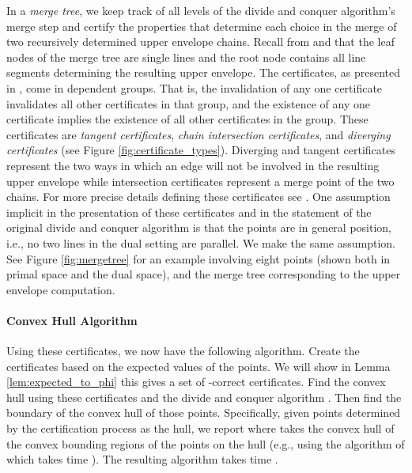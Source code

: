 \documentclass[11pt]{article}
\begin{document}
In a \emph{merge tree}, we keep track of all levels of the divide and conquer algorithm's merge step and certify the properties that determine each choice in the merge of two recursively determined upper envelope chains. 
Recall from \cite{Basch99MobileData} and \cite{Atallah85Dynamic} that the leaf nodes of the merge tree are single lines and the root node contains all line segments determining the resulting upper envelope.  
 The certificates, as presented in \cite{Basch99MobileData}, come in dependent groups. That is, the invalidation of any one certificate invalidates all other certificates in that group, and the existence of any one certificate implies the existence of all other certificates in the group.  
These certificates are \emph{tangent certificates},  
\emph{chain intersection certificates}, 
and \emph{diverging certificates} 
(see Figure \ref{fig:certificate_types}).  Diverging and tangent
certificates represent the two ways in which an edge will not be
involved in the resulting upper envelope while intersection
certificates represent a merge point of the two chains.  For more
precise details defining these certificates see
\cite{Basch99MobileData}.  One assumption implicit in the presentation
of these certificates and in the statement of the original divide and
conquer algorithm is that the points are in general
position, i.e., no two lines in the dual setting are
parallel.  
We make the same assumption. See Figure \ref{fig:mergetree} for an
example involving eight points (shown both in primal space and the dual
space), and the merge tree corresponding
to the  upper envelope computation.


\paragraph*{Convex Hull Algorithm} 
Using these certificates, we now have the following algorithm.  Create the certificates based on the expected values of the points.  We will show in Lemma \ref{lem:expected_to_phi} this gives a set of -correct certificates.  Find the convex hull using these certificates and the  divide and conquer algorithm \cite{Basch99MobileData}.  Then find the boundary of the convex hull of those points.  Specifically, given points  determined by the certification process as the hull, we report  where  takes the convex hull of the convex bounding regions of the points on the hull (e.g., using the algorithm of \cite{devillers95incremental} which takes time ).  The resulting algorithm takes time .
\end{document}
